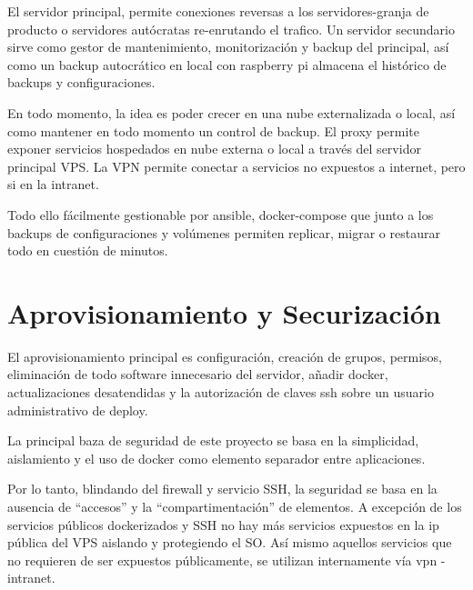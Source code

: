 El servidor principal, permite conexiones reversas a los servidores-granja de producto o servidores autócratas re-enrutando el trafico. Un servidor secundario sirve como gestor de mantenimiento, monitorización y backup del principal, así como un backup autocrático en local con raspberry pi almacena el histórico de backups y configuraciones.

En todo momento, la idea es poder crecer en una nube externalizada o local, así como mantener en todo momento un control de backup. El proxy permite exponer servicios hospedados en nube externa o local a través del servidor principal VPS. La VPN permite conectar a servicios no expuestos a internet, pero si en la intranet.

Todo ello fácilmente gestionable por ansible, docker-compose que junto a los backups de configuraciones y volúmenes permiten replicar, migrar o restaurar todo en cuestión de minutos.

\section{Aprovisionamiento y Securización}
El aprovisionamiento principal es configuración, creación de grupos, permisos, eliminación de todo software innecesario del servidor, añadir docker, actualizaciones desatendidas y la autorización de claves ssh sobre un usuario administrativo de deploy.

La principal baza de seguridad de este proyecto se basa en la simplicidad, aislamiento y el uso de docker como elemento separador entre aplicaciones.

Por lo tanto, blindando del firewall y servicio SSH, la seguridad se basa en la ausencia de “accesos” y la “compartimentación”  de elementos. A excepción de los servicios públicos dockerizados y SSH no hay más servicios expuestos en la ip pública del VPS aislando y protegiendo el SO. Así mismo aquellos servicios que no requieren de ser expuestos públicamente, se utilizan internamente vía vpn - intranet.

